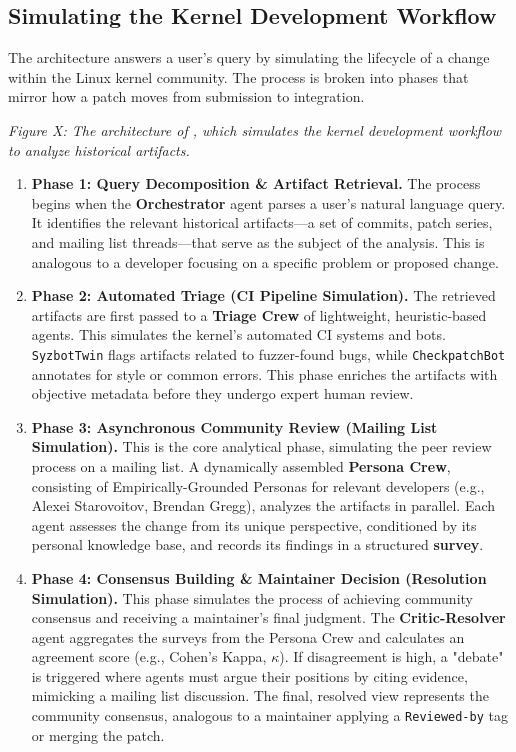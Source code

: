 \subsection{Simulating the Kernel Development Workflow}

The \sys architecture answers a user's query by simulating the lifecycle of a change within the Linux kernel community. The process is broken into phases that mirror how a patch moves from submission to integration.

\emph{Figure X: The architecture of \sys, which simulates the kernel development workflow to analyze historical artifacts.}

\begin{enumerate}
\item \textbf{Phase 1: Query Decomposition \& Artifact Retrieval.} The process begins when the \textbf{Orchestrator} agent parses a user's natural language query. It identifies the relevant historical artifacts—a set of commits, patch series, and mailing list threads—that serve as the subject of the analysis. This is analogous to a developer focusing on a specific problem or proposed change.

\item \textbf{Phase 2: Automated Triage (CI Pipeline Simulation).} The retrieved artifacts are first passed to a \textbf{Triage Crew} of lightweight, heuristic-based agents. This simulates the kernel's automated CI systems and bots. \texttt{SyzbotTwin} flags artifacts related to fuzzer-found bugs, while \texttt{CheckpatchBot} annotates for style or common errors. This phase enriches the artifacts with objective metadata before they undergo expert human review.

\item \textbf{Phase 3: Asynchronous Community Review (Mailing List Simulation).} This is the core analytical phase, simulating the peer review process on a mailing list. A dynamically assembled \textbf{Persona Crew}, consisting of Empirically-Grounded Personas for relevant developers (e.g., Alexei Starovoitov, Brendan Gregg), analyzes the artifacts in parallel. Each agent assesses the change from its unique perspective, conditioned by its personal knowledge base, and records its findings in a structured \textbf{survey}.

\item \textbf{Phase 4: Consensus Building \& Maintainer Decision (Resolution Simulation).} This phase simulates the process of achieving community consensus and receiving a maintainer's final judgment. The \textbf{Critic-Resolver} agent aggregates the surveys from the Persona Crew and calculates an agreement score (e.g., Cohen's Kappa, $\kappa$). If disagreement is high, a "debate" is triggered where agents must argue their positions by citing evidence, mimicking a mailing list discussion. The final, resolved view represents the community consensus, analogous to a maintainer applying a \texttt{Reviewed-by} tag or merging the patch.


\end{enumerate}
